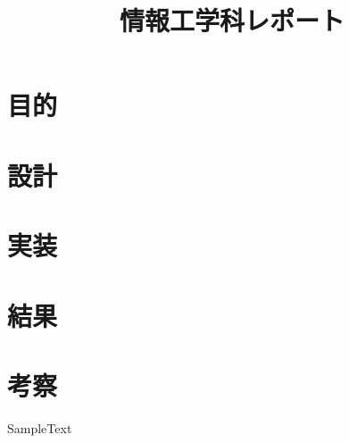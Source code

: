 \documentclass[a4paper]{jsarticle}
\title{情報工学科レポート}
\author{}
\begin{document}
\maketitle
\thispagestyle{empty}
\section{目的}
\section{設計}
\section{実装}
\section{結果}
\section{考察}

\begin{thebibliography}{99}
   SampleText
\end{thebibliography}
\end{document}
